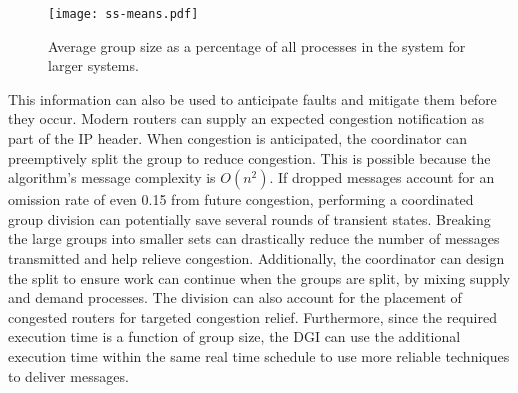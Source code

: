 \begin{figure}
    \centering
    \texttt{[image: ss-means.pdf]}
    \caption{Average group size as a percentage of all processes in the system for larger systems.}
    \label{fig:ss-means}
\end{figure}

This information can also be used to anticipate faults and mitigate them before they occur.
Modern routers can supply an expected congestion notification as part of the IP header\cite{ECN2}.
When congestion is anticipated, the coordinator can preemptively split the group to reduce congestion.
This is possible because the algorithm's message complexity is $O(n^2)$.
If dropped messages account for an omission rate of even 0.15 from future congestion, performing a coordinated group division can potentially save several rounds of transient states.
Breaking the large groups into smaller sets can drastically reduce the number of messages transmitted and help relieve congestion.
Additionally, the coordinator can design the split to ensure work can continue when the groups are split, by mixing supply and demand processes.
The division can also account for the placement of congested routers for targeted congestion relief.
Furthermore, since the required execution time is a function of group size, the DGI can use the additional execution time within the same real time schedule to use more reliable techniques to deliver messages.

